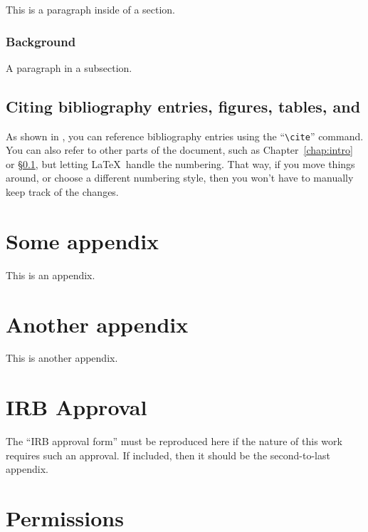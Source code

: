 This is a paragraph inside of a section.

\subsection{Background}
\label{sec:background}

A paragraph in a subsection.

\section{Citing bibliography entries, figures, tables, and }

As shown in \cite{latexCompanion}, you
can reference bibliography entries using the ``\verb|\cite|'' command.
You can also refer to other parts of the document, such as
Chapter~\ref{chap:intro} or \S\ref{sec:background}, but letting
\LaTeX\ handle the numbering. That way, if you move things around, or
choose a different numbering style, then you won't have to manually keep
track of the changes.



\appendix


\chapter{Some appendix}

This is an appendix.


\chapter{Another appendix}

This is another appendix.


\chapter{IRB Approval}

The ``IRB approval form'' must be reproduced here if the nature of this work
requires such an approval. If included, then it should be the second-to-last
appendix.


\chapter{Permissions}

